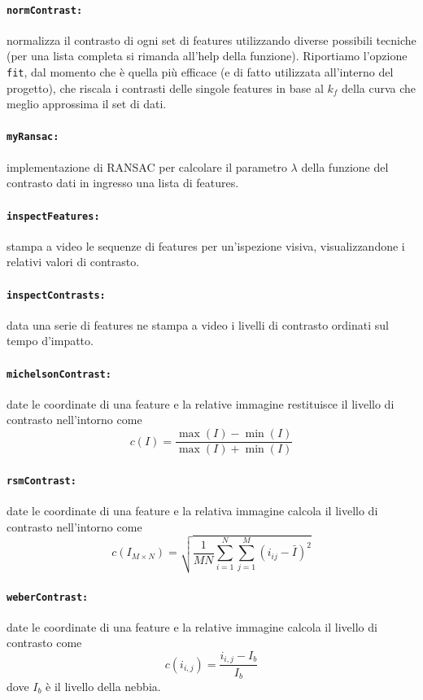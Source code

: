 \documentclass[12pt]{report}
\begin{document}
\paragraph*{\verb_normContrast:_} normalizza il contrasto di ogni set di features utilizzando diverse possibili tecniche (per una lista completa si rimanda all'help della funzione). Riportiamo l'opzione \verb|fit|, dal momento che \`e quella pi\`u efficace (e di fatto utilizzata all'interno del progetto), che riscala i contrasti delle singole features in base al $k_f$ della curva che meglio approssima il set di dati.

\paragraph*{\verb_myRansac:_} implementazione di RANSAC per calcolare il parametro $\lambda$ della funzione del contrasto dati in ingresso una lista di features.

\paragraph*{\verb_inspectFeatures:_} stampa a video le sequenze di features per un'ispezione visiva, visualizzandone i relativi valori di contrasto.


\paragraph*{\verb_inspectContrasts:_} data una serie di features ne stampa a video i livelli di contrasto ordinati sul tempo d'impatto.

\paragraph*{\verb_michelsonContrast:_} date le coordinate di una feature e la relative immagine restituisce il livello di contrasto nell'intorno come $$c\left(I\right) = \frac{\max(I)-\min(I)}{\max(I)+\min(I)}$$

\paragraph*{\verb_rsmContrast:_} date le coordinate di una feature e la relativa immagine calcola il livello di contrasto nell'intorno come $$ c\left(I_{M\times N}\right) = \sqrt{\frac{1}{MN}\sum_{i=1}^N\sum_{j=1}^M(i_{ij}-\bar{I})^2} $$

\paragraph*{\verb_weberContrast:_} date le coordinate di una feature e la relative immagine calcola il livello di contrasto come $$c\left(i_{i,j}\right)= \frac{i_{i,j}-I_b}{I_b}$$ dove $I_b$ \`e il livello della nebbia.
\end{document}
